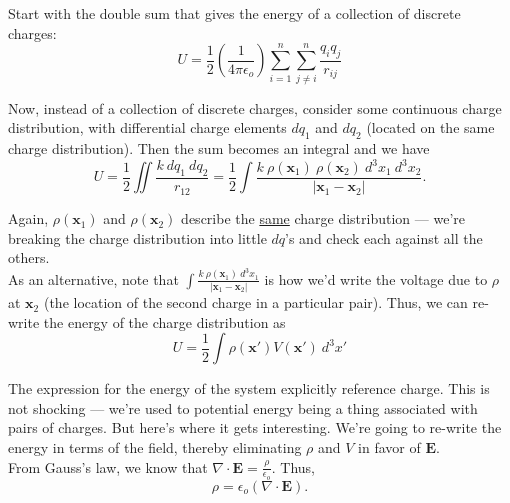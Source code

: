 \documentclass{article}
\numberwithin{equation}{section}
\begin{document}
\begin{mdframed}[backgroundcolor=WHITE,align=left,userdefinedwidth=45em, topline=false, rightline=false,frametitle={Alternate derivation of (\ref{eq:3:u})}]

Start with the double sum that gives the energy of a collection of discrete charges:
\begin{equation*}
    U = \frac{1}{2} \left( \frac{1}{4\pi\epsilon_o} \right) \sum\limits_{i = 1}^{n} \sum\limits_{j \neq i}^{n} \frac{q_i q_j}{r_{ij}}
\end{equation*}

Now, instead of a collection of discrete charges, consider some continuous charge distribution, with differential charge elements $dq_1$ and $dq_2$ (located on the same charge distribution). Then the sum becomes an integral and we have
\begin{equation*}
    U = \frac{1}{2} \iint \frac{k\ dq_1\ dq_2}{r_{12}} = \frac{1}{2} \int \frac{k\ \rho(\bm{x}_1)\ \rho(\bm{x}_2)\ d^3x_1\ d^3x_2}{\left| \bm{x}_1 - \bm{x}_2 \right|}.
\end{equation*}

Again, $\rho(\bm{x}_1)$ and $\rho(\bm{x}_2)$ describe the \underline{same} charge distribution --- we're breaking the charge distribution into little $dq$'s and check each against all the others. \\

As an alternative, note that $\displaystyle \int \frac{k\ \rho(\bm{x}_1)\ d^3x_1}{\left| \bm{x}_1 - \bm{x}_2 \right|}$ is how we'd write the voltage due to $\rho$ at $\bm{x}_2$ (the location of the second charge in a particular pair). Thus, we can re-write the energy of the charge distribution as
\begin{equation*}
    U = \frac{1}{2} \int \rho(\bm{x'}) V(\bm{x'})\ d^3x'
\end{equation*}

\end{mdframed}

The expression for the energy of the system explicitly reference charge. This is not shocking --- we're used to potential energy being a thing associated with pairs of charges. But here's where it gets interesting. We're going to re-write the energy in terms of the field, thereby eliminating $\rho$ and $V$ in favor of $\bm{E}$. \\

From Gauss's law, we know that $\displaystyle \nabla \cdot \bm{E} = \frac{\rho}{\epsilon_o}$. Thus,
\begin{equation*}
    \rho = \epsilon_o \left( \nabla \cdot \bm{E} \right).
\end{equation*}
\end{document}
